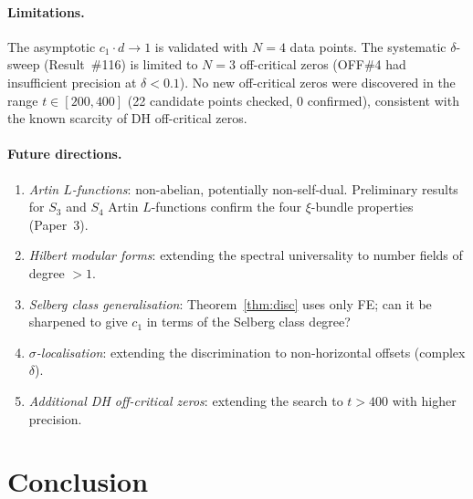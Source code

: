 \documentclass[11pt, a4paper]{article}
\theoremstyle{plain}
\theoremstyle{definition}
\begin{document}
\paragraph{Limitations.}
The asymptotic $c_{1}\cdot d \to 1$ is validated with $N=4$ data points.
The systematic $\delta$-sweep (Result~\#116) is limited to $N=3$
off-critical zeros (OFF\#4 had insufficient precision at $\delta<0.1$).
No new off-critical zeros were discovered in the range $t\in[200,400]$
(22 candidate points checked, 0 confirmed), consistent with the
known scarcity of DH off-critical zeros.

\paragraph{Future directions.}
\begin{enumerate}
  \item \textit{Artin $L$-functions}: non-abelian, potentially non-self-dual.
        Preliminary results for $S_3$ and $S_4$ Artin $L$-functions
        confirm the four $\xi$-bundle properties (Paper~3).
  \item \textit{Hilbert modular forms}: extending the spectral universality
        to number fields of degree $>1$.
  \item \textit{Selberg class generalisation}: Theorem~\ref{thm:disc}
        uses only FE; can it be sharpened to give $c_{1}$ in terms of
        the Selberg class degree?
  \item \textit{$\sigma$-localisation}: extending the discrimination to
        non-horizontal offsets (complex $\delta$).
  \item \textit{Additional DH off-critical zeros}: extending the search
        to $t>400$ with higher precision.
\end{enumerate}


\section{Conclusion}
\label{sec:conclusion}
\end{document}
